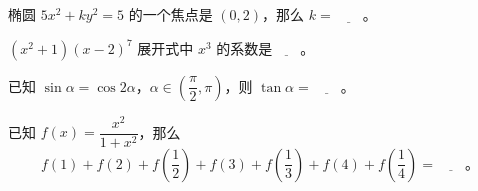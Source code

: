 \begin{question}
椭圆 $5x^2+ky^2=5$ 的一个焦点是 $(0,2)$，那么 $k=\underline{\qquad}$。

\end{question}
\begin{question}
$(x^2+1)(x-2)^7$ 展开式中 $x^3$ 的系数是$\underline{\qquad}$。

\end{question}
\begin{question}
已知 $\sin\alpha=\cos2\alpha$，$\alpha\in\left(\dfrac\pi2,\pi\right)$，则 $\tan\alpha=\underline{\qquad}$。

\end{question}
\begin{question}
已知 $f(x)=\dfrac{x^2}{1+x^2}$，那么
\nopagebreak[4]
\[f(1)+f(2)+f\left(\frac12\right)+f(3)+f\left(\frac13\right)+f(4)+f\left(\frac14\right)=\underline{\qquad}\text{。}\]

\end{question}

